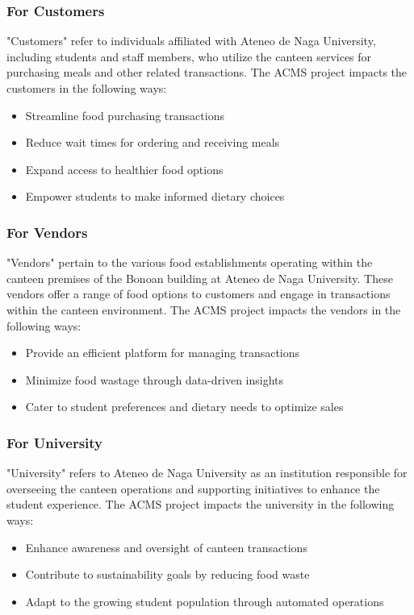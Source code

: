 \subsubsection{For Customers}
"Customers" refer to individuals affiliated with Ateneo de Naga University, including students and staff members, who utilize the canteen services for purchasing meals and other related transactions.  The ACMS project impacts the customers in the following ways:
\begin{itemize}
\item Streamline food purchasing transactions
\item Reduce wait times for ordering and receiving meals
\item Expand access to healthier food options
\item Empower students to make informed dietary choices
\end{itemize}

\subsubsection{For Vendors}
"Vendors" pertain to the various food establishments operating within the canteen premises of the Bonoan building at Ateneo de Naga University. These vendors offer a range of food options to customers and engage in transactions within the canteen environment. The ACMS project impacts the vendors in the following ways:
\begin{itemize}
\item Provide an efficient platform for managing transactions
\item Minimize food wastage through data-driven insights
\item Cater to student preferences and dietary needs to optimize sales
\end{itemize}

\subsubsection{For University}
"University" refers to Ateneo de Naga University as an institution responsible for overseeing the canteen operations and supporting initiatives to enhance the student experience. The ACMS project impacts the university in the following ways:
\begin{itemize}
\item Enhance awareness and oversight of canteen transactions
\item Contribute to sustainability goals by reducing food waste
\item Adapt to the growing student population through automated operations
\end{itemize}

